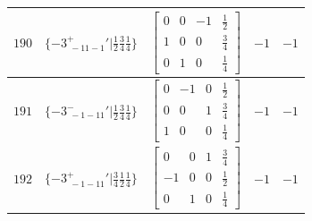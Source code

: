 \documentclass[fleqn,8pt]{jsarticle}
\begin{document}
\begin{longtable}{ccccc}
$ 190 $ & $ \{-3^{+}_{\,\,-11-1}{}'|\frac{1}{2} \frac{3}{4} \frac{1}{4}\} $ & $ \begin{bmatrix} 0 & 0 & -1 & \frac{1}{2} \\ 1 & 0 & 0 & \frac{3}{4} \\ 0 & 1 & 0 & \frac{1}{4} \end{bmatrix} $ & $ -1 $ & $ -1 $ \\ \hline
$ 191 $ & $ \{-3^{-}_{\,\,-1-11}{}'|\frac{1}{2} \frac{3}{4} \frac{1}{4}\} $ & $ \begin{bmatrix} 0 & -1 & 0 & \frac{1}{2} \\ 0 & 0 & 1 & \frac{3}{4} \\ 1 & 0 & 0 & \frac{1}{4} \end{bmatrix} $ & $ -1 $ & $ -1 $ \\ \hline
$ 192 $ & $ \{-3^{+}_{\,\,-1-11}{}'|\frac{3}{4} \frac{1}{2} \frac{1}{4}\} $ & $ \begin{bmatrix} 0 & 0 & 1 & \frac{3}{4} \\ -1 & 0 & 0 & \frac{1}{2} \\ 0 & 1 & 0 & \frac{1}{4} \end{bmatrix} $ & $ -1 $ & $ -1 $ \\
\end{longtable}
\end{document}
